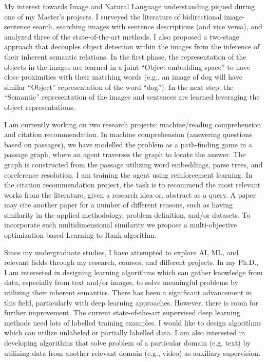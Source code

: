 \documentclass[12pt]{article}
\begin{document}
My interest towards Image and Natural Language understanding piqued during one of my Master's projects. I surveyed the literature of bidirectional image-sentence search, searching images with sentence descriptions (and vice versa), and analyzed three of the state-of-the-art methods. I also proposed a two-stage approach that decouples object detection within the images from the inference of their inherent semantic relations. In the first phase, the representation of the objects in the images are learned in a joint ``Object embedding space'' to have close proximities with their matching words (e.g., an image of dog will have similar ``Object'' representation of the word ``dog''). In the next step, the ``Semantic'' representation of the images and sentences are learned leveraging the object representations. 

I am currently working on two research projects: machine/reading comprehension and citation recommendation. In machine comprehension (answering questions based on passages), we have modelled the problem as a path-finding game in a passage graph, where an agent traverses the graph to locate the answer. The graph is constructed from the passage utilizing word embeddings, parse trees, and coreference resolution. I am training the agent using reinforcement learning. In the citation recommendation project, the task is to recommend the most relevant works from the literature, given a research idea or, abstract as a query. A paper may cite another paper for a number of different reasons, such as having similarity in the applied methodology, problem definition, and/or datasets. To incorporate such multidimensional similarity we propose a multi-objective optimization based Learning to Rank algorithm. 

Since my undergraduate studies, I have attempted to explore AI, ML, and relevant fields through my research, courses, and different projects. In my Ph.D., I am interested in designing learning algorithms which can gather knowledge from data, especially from text and/or images, to solve meaningful problems by utilizing their inherent semantics. There has been a significant advancement in this field, particularly with deep learning approaches. However, there is room for further improvement. The current state-of-the-art supervised deep learning methods need lots of labelled training examples. I would like to design algorithms which can utilize unlabeled or partially labelled data. I am also interested in developing algorithms that solve problem of a particular domain (e.g, text) by utilizing data from another relevant domain (e.g., video) as auxiliary supervision.
\end{document}
